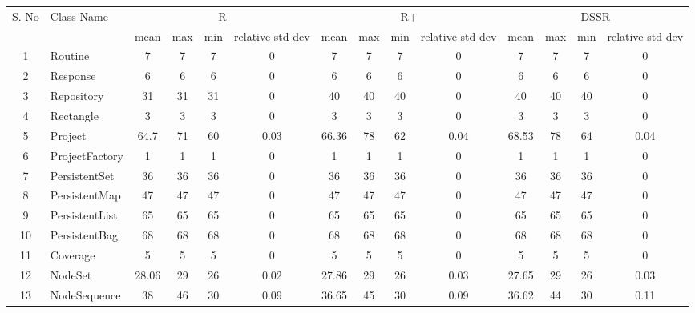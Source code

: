 \documentclass[conference]{IEEEtran}
\begin{document}
\newpage

 \begin{table} [ht] {
  \scriptsize
    \begin{tabular}{|c|l|c|c|c|c|c|c|c|c|c|c|c|c|}
      \hline
      \multirow{2}{*}{S. No}		& \multirow{2}{*}{Class Name}		& \multicolumn{4}{|c|}{R}							&	\multicolumn{4}{|c|}{R+}							&	\multicolumn{4}{|c|}{DSSR}	\\
      \cline{3-14} 
      						&							& mean & max & min & relative std dev				& mean 	& max 	& min 	& relative std dev 		& mean 		& 	max 		&	 min 		& relative std dev \\
             \hline
     
 1						& Routine						& 7	&	7	&	7	& 		0					& 7		&  7		& 7		& 		0			& 7			& 7			& 7			&	0	\\
 2						& Response					& 6	&	6	&	6	& 		0					& 6		&  6		& 6		& 		0			& 6			& 6			& 6			&	0	\\
 3						& Repository					& 31	&	31	&	31	& 		0					& 40		&  40		& 40		& 		0			& 40			& 40			& 40			&	0	\\      
 4						& Rectangle					& 3	&	3	&	3	& 		0					& 3		&  3 		& 3		& 		0			& 3			& 3			& 3			&	0	\\      
 5						& Project						& 64.7&	71	&	60	& 		0.03					& 66.36	&  78		& 62		& 		0.04			& 68.53		& 78			& 64			&	0.04	\\      
 6						& ProjectFactory				& 1	&	1	&	1	& 		0					& 1		&  1		& 1		& 		0			& 1			& 1			& 1			&	0	\\      
 7						& PersistentSet					& 36	&	36	&	36	& 		0					& 36		&  36		& 36		& 		0			& 36			& 36			& 36 			&	0	\\      
 8						& PersistentMap				& 47	&	47	&	47	& 		0					& 47		&  47		& 47		& 		0			& 47			& 47			& 47			&	0	\\      
 9						& PersistentList					& 65	&	65	&	65	& 		0					& 65		&  65		& 65		& 		0			& 65			& 65			& 65			&	0	\\      
 10						& PersistentBag				& 68	&	68	&	68	& 		0					& 68		&  68		& 68		& 		0			& 68			& 68			& 68			&	0	\\      
 11						& Coverage					& 5	&	5	&	5	& 		0					& 5		& 5		& 5		& 		0			& 5			& 5			& 5			&	0	\\      
 12						& NodeSet					& 28.06&	29	&	26	& 		0.02					& 27.86	& 29 		& 26		& 		0.03			& 27.65		& 29			& 26			&	0.03	\\      
 13						& NodeSequence				& 38	&	46	&	30	& 		0.09					& 36.65	& 45 		& 30		& 		0.09			& 36.62		& 44			& 30			&	0.11	\\      

\end{tabular}}
\end{table}
\end{document}
